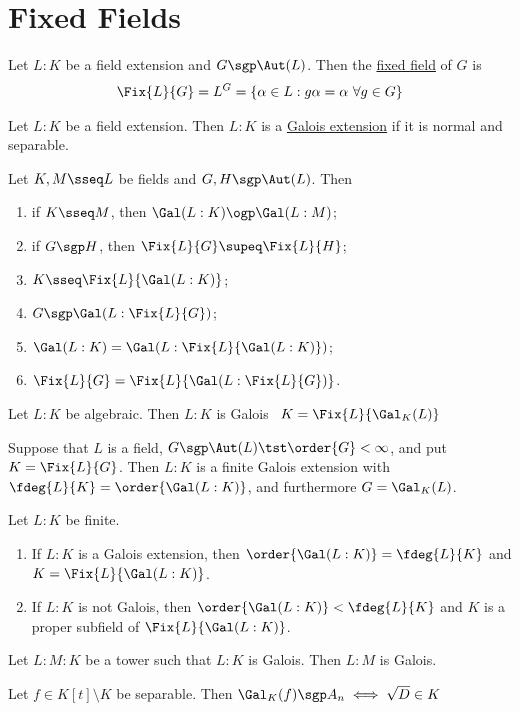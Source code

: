 \documentclass[a4paper]{article}
\begin{document}
\section{Fixed Fields}
\begin{tdefinition}
  Let \( L:K \) be a field extension and \( G\sgp \Aut(L) \). Then the \ul{fixed field} of \( G \) is \begin{align*}
    \Fix{L}{G} = L^G = \{\alpha\in L : g\alpha= \alpha\ \forall g\in G\}
  \end{align*}
\end{tdefinition}

\begin{tdefinition}
  Let \( L:K \) be a field extension.
  Then \( L:K \) is a \ul{Galois extension} if it is normal and separable.
\end{tdefinition}

\begin{tlemma}
  Let \( K,M \sseq L \) be fields and \( G, H \sgp \Aut(L) \).
  Then \begin{enumerate}[label=\arabic*)]
    \item if \( K\sseq M \), then \( \Gal(L:K) \ogp \Gal(L:M) \);
    \item if \( G\sgp H \), then \( \Fix{L}{G} \supeq \Fix{L}{H} \);
    \item \( K\sseq \Fix{L}{\Gal(L:K)} \);
    \item \( G\sgp\Gal(L:\Fix{L}{G}) \);
    \item \( \Gal(L:K) = \Gal(L:\Fix{L}{\Gal(L:K)}) \);
    \item \( \Fix{L}{G} = \Fix{L}{\Gal(L:\Fix{L}{G})} \).
  \end{enumerate}
\end{tlemma}

\begin{ttheorem}
  Let \( L:K \) be algebraic.
  Then \( L:K \) is Galois \iff~\( K=\Fix{L}{\Gal_K(L)} \)
\end{ttheorem}

\begin{ttheorem}
  Suppose that \( L \) is a field, \( G\sgp \Aut(L) \tst \order{G}<\infty\), and put \( K=\Fix{L}{G} \).
  Then \( L:K \) is a finite Galois extension with \( \fdeg{L}{K}=\order{\Gal(L:K)} \), and furthermore \( G=\Gal_K(L) \).
\end{ttheorem}

\begin{ttheorem}
  Let \( L:K \) be finite.
  \begin{enumerate}
    \item If \( L:K \) is a Galois extension, then \( \order{\Gal(L:K)}=\fdeg{L}{K} \) and \( K=\Fix{L}{\Gal(L:K)} \).
    \item If \( L:K \) is not Galois, then \( \order{\Gal(L:K)}<\fdeg{L}{K} \) and \( K \) is a proper subfield of \( \Fix{L}{\Gal(L:K)} \).
  \end{enumerate}
\end{ttheorem}

\begin{tcorollary}
  Let \( L:M:K \) be a tower such that \( L:K \) is Galois.
  Then \( L:M \) is Galois.
\end{tcorollary}

\begin{tproposition}
  Let \( f \in K[t]\setminus K \) be separable.
  Then \( \Gal_K(f)\sgp A_n \iff \sqrt D\in K \)
\end{tproposition}
\end{document}
